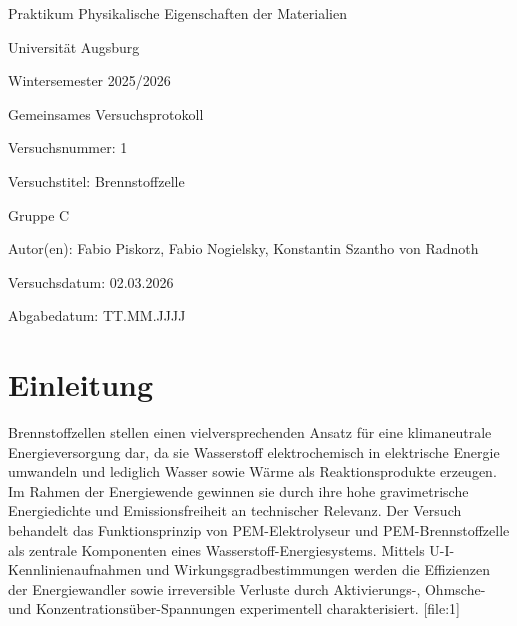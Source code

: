 \documentclass[11pt,a4paper]{article}
\numberwithin{equation}{section}%
\numberwithin{equation}{section}
\newcommand{\Lehrveranstaltung}{Praktikum Physikalische Eigenschaften der Materialien}
\newcommand{\Universitaet}{Universität Augsburg}
\newcommand{\Semester}{Wintersemester 2025/2026}
\newcommand{\Versuchsnummer}{1}
\newcommand{\Versuchstitel}{Brennstoffzelle}
\newcommand{\Gruppe}{C}
\newcommand{\Versuchsdatum}{02.03.2026}
\newcommand{\Abgabedatum}{TT.MM.JJJJ}
\newcommand{\Abgabeart}{Gemeinsames Versuchsprotokoll}
\newcommand{\Autor}{Fabio Piskorz, Fabio Nogielsky, Konstantin Szantho von Radnoth }
\begin{document}

\begin{titlepage}
    \centering
    {\Large \Lehrveranstaltung\par}
    \vspace{0.5cm}
    {\large \Universitaet\par}
    \vspace{0.5cm}
    {\large \Semester\par}
    \vspace{1.5cm}
    {\LARGE \Abgabeart\par}
    \vspace{0.5cm}
    {\Large Versuchsnummer: \Versuchsnummer\par}
    \vspace{0.5cm}
    {\Large Versuchstitel: \Versuchstitel\par}
    \vspace{1.5cm}
    {\large Gruppe \Gruppe\par}
    \vspace{0.5cm}
    {\large Autor(en): \Autor\par}
    \vspace{1.5cm}
    {\large Versuchsdatum: \Versuchsdatum\par}
    \vspace{0.5cm}
    {\large Abgabedatum: \Abgabedatum\par}

    \vfill
\end{titlepage}


\section{Einleitung}

Brennstoffzellen stellen einen vielversprechenden Ansatz für eine klimaneutrale Energieversorgung dar, da sie Wasserstoff elektrochemisch in elektrische Energie umwandeln und lediglich Wasser sowie Wärme als Reaktionsprodukte erzeugen. Im Rahmen der Energiewende gewinnen sie durch ihre hohe gravimetrische Energiedichte und Emissionsfreiheit an technischer Relevanz. Der Versuch behandelt das Funktionsprinzip von PEM-Elektrolyseur und PEM-Brennstoffzelle als zentrale Komponenten eines Wasserstoff-Energiesystems. Mittels U-I-Kennlinienaufnahmen und Wirkungsgradbestimmungen werden die Effizienzen der Energiewandler sowie irreversible Verluste durch Aktivierungs-, Ohmsche- und Konzentrationsüber-Spannungen experimentell charakterisiert. [file:1]
\end{document}
